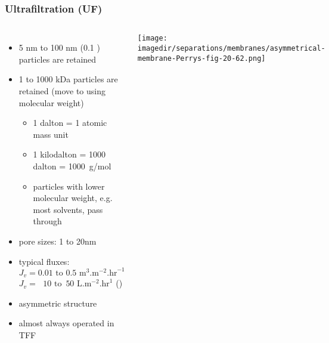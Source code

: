 \begin{frame}\frametitle{Ultrafiltration (UF)}	
	\begin{columns}[c]
			\vspace{-20pt}
			\begin{itemize}
				\item	5 nm to 100 nm (0.1 \micron) particles are retained
				\item	1 to 1000 kDa particles are retained (move to using molecular weight)
				\begin{itemize}
					\item	1 dalton = 1 atomic mass unit
					\item	1 kilodalton = 1000 dalton = 1000~g/mol
					\item	particles with lower molecular weight, e.g. most solvents, pass through
				\end{itemize}
				\item	pore sizes: 1 to 20nm
				\item	typical fluxes: $J_v = 0.01 \text{~to~} 0.5 \text{~m}^3\text{.m}^{-2}.\text{hr}^{-1}$\\$J_v = ~~\,10 \text{~to~} \,50 \text{~L}\text{.m}^{-2}.\text{hr}^{1}$ ({\color{purple}{LMH}})
				\item	asymmetric structure
				\item	almost always operated in TFF
			\end{itemize}
			\begin{center}
				\texttt{[image: \\imagedir/separations/membranes/asymmetrical-membrane-Perrys-fig-20-62.png]}
			\end{center}
			\vspace{-12pt}
	\end{columns}
\end{frame}

